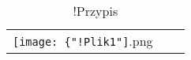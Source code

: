 \begin{table}[ht]
\centering
\begin{tabularx}{0.43\textwidth}{@{\hspace{1.7 mm}}Xcc@{\hspace{1.7 mm}}}
\texttt{[image: \{"!Plik1"]}.png}  \\
\end{tabularx}
\caption{!Przypis}
\end{table}


